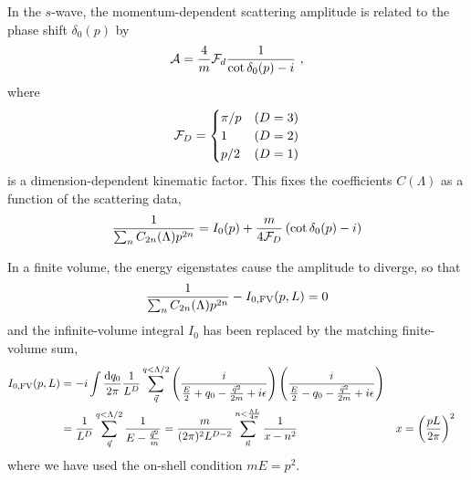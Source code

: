 In the $s$-wave, the momentum-dependent scattering amplitude is related to the phase shift $\delta_0(p)$ by
\begin{equation}\label{eq:cot delta}
    \mathcal{A} = \frac{4}{m}\mathcal{F}_d\frac{1}{\cot \delta_0(p)-i}\ ,
\end{equation}
where
\begin{equation}
    \mathcal{F}_D
    =
    \begin{cases}
        \pi/p   & (D=3)\\
        1       & (D=2)\\
        p/2     & (D=1)
\end{cases}
\end{equation}
is a dimension-dependent kinematic factor.
This fixes the coefficients $C(\Lambda)$ as a function of the scattering data,
\begin{equation}
    \frac{1}{\sum_n C_{2n}(\Lambda) p^{2n}}
    =
    I_0(p) + \frac{m}{4 \mathcal{F}_D}\left(\cot \delta_0(p) - i\right)
\end{equation}

In a finite volume, the energy eigenstates cause the amplitude to diverge, so that
\begin{equation}
    \frac{1}{\sum_n C_{2n}(\Lambda) p^{2n}} - I_{0,\textrm{FV}}(p,L) = 0
\end{equation}
and the infinite-volume integral $I_0$ has been replaced by the matching finite-volume sum,
\begin{align}
I_{0,\textrm{FV}}(p,L)
    &=-i\int \frac { \mathrm {d}q_0}{2\pi} \frac{1}{L^D}\sum_{\vec{q}}^{q < \Lambda/2} \left( \frac { i } { \frac{E}{2} + q _ { 0 } - \frac{\vec{q}^2}{2m} + i \epsilon } \right) \left( \frac { i } { \frac{E}{2} - q _ { 0 } - \frac{\vec{q}^2}{2m} + i \epsilon } \right)
    \\
    &=\frac{1}{L^D}\sum_{\vec{q}}^{q < \Lambda/2} \frac { 1 } { E - \frac{\vec{q}^2}{m} }
    =\frac{m}{(2\pi)^2 L^{D-2}} \sum_{\vec{n}}^{n < \frac{\Lambda L}{4\pi}} \frac{1}{x-n^2}
    &
    x &= \left( \frac{pL}{2\pi}\right)^2
\end{align}
where we have used the on-shell condition $mE=p^2$.

